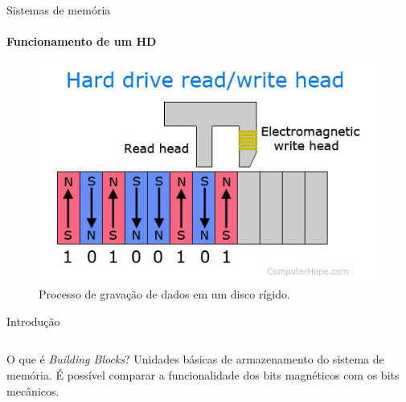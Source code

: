 \begin{frame}[t]{Sistemas de memória}
    \transboxout[duration=0.5]
    \framesubtitle{Funcionamento de um HD}    %

    \begin{figure}[H]
        \centering
        \includegraphics[scale = 0.40]{source/pictures/magnetic-media.jpg}
        \caption{Processo de gravação de dados em um disco rígido\cite{hdd-image}.}
        \label{fig:device}
    \end{figure}
\end{frame}

\begin{frame}[t]{Introdução}
    \transboxout[duration=0.5]
    \begin{columns}
    \end{columns}

    \begin{block}{O que é \textit{Building Blocks}?}
        Unidades básicas de armazenamento do sistema de memória. É possível comparar a funcionalidade dos bits magnéticos com os bits mecânicos.
    \end{block}
\end{frame}
